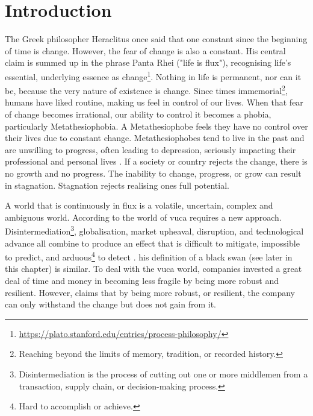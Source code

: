 \chapter{Introduction}
\label{ch:introduction}
The Greek philosopher Heraclitus once said that one constant since the beginning of time is change. However, the fear of change is also a constant.  His central claim is summed up in the phrase Panta Rhei ("life is flux"), recognising life's essential, underlying essence as change\footnote[1]{\url{https://plato.stanford.edu/entries/process-philosophy/}}. Nothing in life is permanent, nor can it be, because the very nature of existence is change. Since times immemorial\footnote{Reaching beyond the limits of memory, tradition, or recorded history.}, humans have liked routine, making us feel in control of our lives. When that fear of change becomes irrational, our ability to control it becomes a phobia, particularly Metathesiophobia. A Metathesiophobe feels they have no control over their lives due to constant change. Metathesiophobes tend to live in the past and are unwilling to progress, often leading to depression, seriously impacting their professional and personal lives \parencite{PsychTimes}. If a society or country rejects the change, there is no growth and no progress. The inability to change, progress, or grow can result in stagnation. Stagnation rejects realising ones full potential. \parencite{Mark2010, Arapahoe2020}

A world that is continuously in flux is a volatile, uncertain, complex and ambiguous world. \parencite{Bennett2014,Sinha2020} According to \textcite{Bennett2014} the world of \acrfull{vuca} requires a new approach. Disintermediation\footnote{Disintermediation is the process of cutting out one or more middlemen from a transaction, supply chain, or decision-making process.}, globalisation, market upheaval, disruption, and technological advance all combine to produce an effect that is difficult to mitigate,  impossible to predict, and arduous\footnote{Hard to accomplish or achieve.} to detect \parencite[p. 885]{OReilly2019}. \textcite{Taleb2008} his definition of a black swan (see later in this chapter) is similar. To deal with the \acrshort{vuca} world, companies invested a great deal of time and money in becoming less \gls{fragile} by being more \gls{robust} and \gls{resilient}. However, \textcite{Taleb2012} claims that by being more \gls{robust}, or \gls{resilient}, the company can only withstand the change but does not gain from it.

